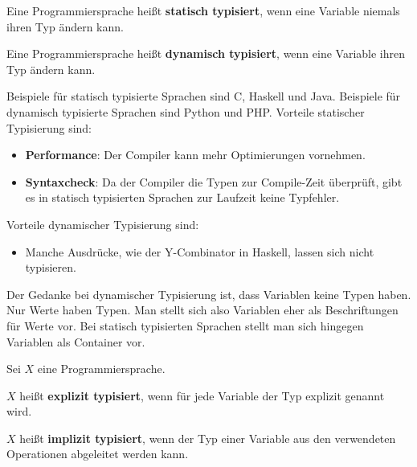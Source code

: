 \begin{definition}%
    \begin{defenum}
        \item Eine Programmiersprache heißt \textbf{statisch typisiert}, wenn eine
              Variable niemals ihren Typ ändern kann.
        \item Eine Programmiersprache heißt \textbf{dynamisch typisiert}, wenn eine
              Variable ihren Typ ändern kann.
    \end{defenum}
\end{definition}

Beispiele für statisch typisierte Sprachen sind C, Haskell und Java.
Beispiele für dynamisch typisierte Sprachen sind Python und PHP.
\goodbreak
Vorteile statischer Typisierung sind:

\begin{itemize}
    \item \textbf{Performance}: Der Compiler kann mehr Optimierungen vornehmen.
    \item \textbf{Syntaxcheck}: Da der Compiler die Typen zur Compile-Zeit überprüft,
                                gibt es in statisch typisierten Sprachen zur
                                Laufzeit keine Typfehler.
\end{itemize}

Vorteile dynamischer Typisierung sind:

\begin{itemize}
    \item Manche Ausdrücke, wie der Y-Combinator in Haskell, lassen sich nicht
          typisieren.
\end{itemize}

Der Gedanke bei dynamischer Typisierung ist, dass Variablen keine Typen haben.
Nur Werte haben Typen. Man stellt sich also Variablen eher als Beschriftungen für
Werte vor. Bei statisch typisierten Sprachen stellt man sich hingegen Variablen
als Container vor.

\begin{definition}%
    Sei $X$ eine Programmiersprache.
    \begin{defenum}
        \item $X$ heißt \textbf{explizit typisiert}, wenn für jede
              Variable der Typ explizit genannt wird.
        \item $X$ heißt \textbf{implizit typisiert}, wenn der Typ einer
              Variable aus den verwendeten Operationen abgeleitet werden kann.
    \end{defenum}
\end{definition}

